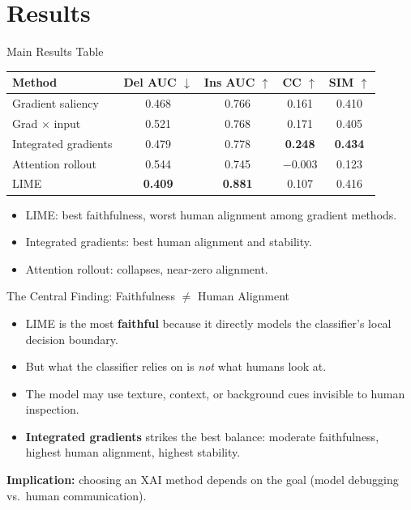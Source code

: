 \documentclass{beamer}
\begin{document}
\section{Results}

\begin{frame}{Main Results Table}
\begin{center}
\small
\begin{tabular}{lcccc}
\toprule
Method & Del AUC $\downarrow$ & Ins AUC $\uparrow$ & CC $\uparrow$ & SIM $\uparrow$ \\
\midrule
Gradient saliency & 0.468 & 0.766 & 0.161 & 0.410 \\
Grad $\times$ input & 0.521 & 0.768 & 0.171 & 0.405 \\
Integrated gradients & 0.479 & 0.778 & \textbf{0.248} & \textbf{0.434} \\
Attention rollout & 0.544 & 0.745 & $-$0.003 & 0.123 \\
LIME & \textbf{0.409} & \textbf{0.881} & 0.107 & 0.416 \\
\bottomrule
\end{tabular}
\end{center}
\vfill
\begin{itemize}
  \item LIME: best faithfulness, worst human alignment among gradient methods.
  \item Integrated gradients: best human alignment and stability.
  \item Attention rollout: collapses, near-zero alignment.
\end{itemize}
\end{frame}

\begin{frame}{The Central Finding: Faithfulness $\neq$ Human Alignment}
\begin{itemize}
  \item LIME is the most \textbf{faithful} because it directly models the classifier's local decision boundary.
  \item But what the classifier relies on is \emph{not} what humans look at.
  \item The model may use texture, context, or background cues invisible to human inspection.
  \item \textbf{Integrated gradients} strikes the best balance: moderate faithfulness, highest human alignment, highest stability.
\end{itemize}
\vfill
\textbf{Implication:} choosing an XAI method depends on the goal (model debugging vs.\ human communication).
\end{frame}
\end{document}
